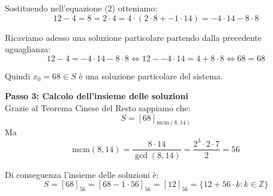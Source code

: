 \documentclass[12pt]{article}
\begin{document}
Sostituendo nell'equazione (2) otteniamo:
$$12 - 4 = 8 = 2 \cdot 4 = 4 \cdot (2 \cdot 8 + -1 \cdot 14) = -4 \cdot 14 - 8 \cdot 8$$

Ricaviamo adesso una soluzione particolare partendo dalla precedente uguaglianza:
$$12 - 4 = -4 \cdot 14 - 8 \cdot 8 \iff 12 - -4 \cdot 14 = 4 + 8 \cdot 8 \iff 68 = 68$$

Quindi $x_0 = 68 \in S$ è una soluzione particolare del sistema.


\textbf{Passo 3: Calcolo dell'insieme delle soluzioni} \\ 
Grazie al Teorema Cinese del Resto sappiamo che:
$$S = [68]_{\mathrm{mcm}(8, 14)}$$
Ma
$$\mathrm{mcm}({8}, {14}) = \frac{{8} \cdot {14}}{\gcd({8},{14})} = \frac{{2^{3}} \cdot {2 \cdot 7}}{2} = {56}$$

Di conseguenza l'insieme delle soluzioni è:
        $$S = [68]_{56} = [68 - 1 \cdot 56]_{56} = [12]_{56} = \{12 + 56 \cdot k : k \in \mathbb{Z}\}$$
        
\end{document}
